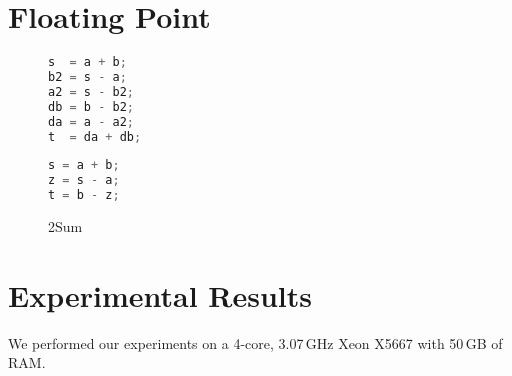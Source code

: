 \documentclass[a4paper]{llncs}
\begin{document}
\section{Floating Point}

\begin{figure}
 \begin{lstlisting}[language=c]
s  = a + b;
b2 = s - a;
a2 = s - b2;
db = b - b2;
da = a - a2;
t  = da + db;
 \end{lstlisting}

\begin{lstlisting}[language=c]
s = a + b;
z = s - a;
t = b - z;
\end{lstlisting}

 
 \label{fig:2sum}
 \caption{2Sum}
\end{figure}


\section{Experimental Results}
\label{sec:experiments}

We performed our experiments on a 4-core, 3.07\,GHz Xeon X5667 with 50\,GB of RAM.
\end{document}

